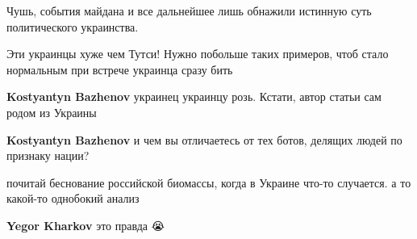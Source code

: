 \begin{itemize}
\begin{itemize}
Чушь, события майдана и все дальнейшее лишь обнажили истинную суть политического украинства.
\end{itemize}

 
Эти украинцы хуже чем Тутси! Нужно побольше таких примеров, чтоб стало
нормальным при встрече украинца сразу бить

\begin{itemize}
 
\textbf{Kostyantyn Bazhenov} украинец украинцу розь. Кстати, автор статьи сам родом из Украины

 
\textbf{Kostyantyn Bazhenov} и чем вы отличаетесь от тех ботов, делящих людей по признаку нации?
\end{itemize}

 
почитай беснование российской биомассы, когда в Украине что-то случается. а то
какой-то однобокий анализ

\begin{itemize}
 
\textbf{Yegor Kharkov} это правда 😭

 

\end{itemize}
\end{itemize}
